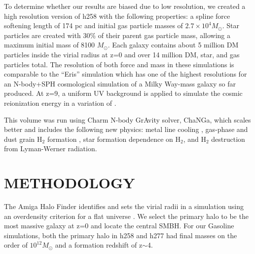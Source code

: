 \documentclass[12pt,headA,chapB]{fiskthesis}
\begin{document}
To determine whether our results are biased due to low resolution, we created a high resolution version of h258 with the following properties: a spline force softening length of 174 pc and initial gas particle masses of $2.7 \times 10^4 M_{\odot}$. Star particles are created with 30\% of their parent gas particle mass, allowing a maximum initial mass of 8100 $M_{\odot}$. Each galaxy contains about 5 million DM particles inside the virial radius at z=0 and over 14 million DM, star, and gas particles total. The resolution of both force and mass in these simulations is comparable to the ``Eris'' simulation which has one of the highest resolutions for an N-body+SPH cosmological simulation of a Milky Way-mass galaxy so far produced.  At z=9, a uniform UV background is applied to simulate the cosmic reionization energy in a variation of \cite{Haardt2012}.

This volume was run using Charm N-body GrAvity solver, ChaNGa, which scales better and includes the following new physics: metal line cooling \citep{Christensen2012,Shen2010}, gas-phase and dust grain H$_2$ formation \citep{Christensen2014}, star formation dependence on H$_2$, and H$_2$ destruction from Lyman-Werner radiation. 



\chapter{\normalsize METHODOLOGY}
\thispagestyle{empty}

The Amiga Halo Finder identifies and sets the virial radii in a simulation using an overdensity criterion for a flat universe \citep{Knebe2001,Knollmann2009,Gill2004}. We select the primary halo to be the most massive galaxy at z=0 and locate the central SMBH. For our Gasoline simulations, both the primary halo in h258 and h277 had final masses on the order of $10^{12} M_{\odot}$ and a formation redshift of z$\sim$4.  

\end{document}

